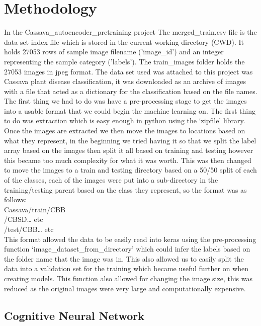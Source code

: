 \section{Methodology}
\label{Methodology Section}

In the Cassava\_autoencoder\_pretraining project \cite{Kaggle} The merged\_train.csv file is the data set index file which is stored in the current working directory (CWD). It holds 27053 rows of sample image filename ('image\_id') and an integer representing the sample category ('labels'). The train\_images folder holds the 27053 images in jpeg format. The data set used was attached to this project was Cassava plant disease classification, it was downloaded as an archive of images with a file that acted as a dictionary for the classification based on the file names. The first thing we had to do was have a pre-processing stage to get the images into a usable format that we could begin the machine learning on. The first thing to do was extraction which is easy enough in python using the ‘zipfile’ library. Once the images are extracted we then move the images to locations based on what they represent, in the beginning we tried having it so that we split the label array based on the images then split it all based on training and testing however this became too much complexity for what it was worth. This was then changed to move the images to a train and testing directory based on a 50/50 split of each of the classes, each of the images were put into a sub-directory in the training/testing parent based on the class they represent, so the format was as follows: \\

Cassava/train/CBB \\
 	          /CBSD… etc \\
	/test/CBB… etc \\
	
This format allowed the data to be easily read into keras using the pre-processing function ‘image\_dataset\_from\_directory’ which could infer the labels based on the folder name that the image was in. This also allowed us to easily split the data into a validation set for the training which became useful further on when creating models. This function also allowed for changing the image size, this was reduced as the original images were very large and computationally expensive. 

\subsection{Cognitive Neural Network}

